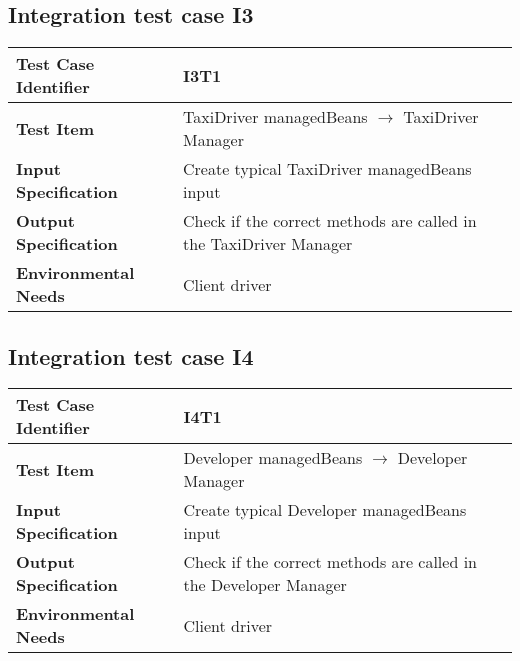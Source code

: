 \subsection{Integration test case I3}

\begin{table}[!htbp]
\begin{center}
\begin{tabular}[t]{p{}p{}}

\hline
\textbf{Test Case Identifier} & I3T1 \\
\hline
\textbf{Test Item} & TaxiDriver managedBeans $\rightarrow$ TaxiDriver Manager \\
\hline
\textbf{Input Specification} & Create typical TaxiDriver managedBeans input  \\
\hline
\textbf{Output Specification} & Check if the correct methods are called in the TaxiDriver Manager \\
\hline
\textbf{Environmental Needs} & Client driver \\
\hline

\end{tabular}
\end{center}
\end{table}

\subsection{Integration test case I4}

\begin{table}[!htbp]
\begin{center}
\begin{tabular}[t]{p{}p{}}

\hline
\textbf{Test Case Identifier} & I4T1 \\
\hline
\textbf{Test Item} & Developer managedBeans $\rightarrow$ Developer Manager \\
\hline
\textbf{Input Specification} & Create typical Developer managedBeans input  \\
\hline
\textbf{Output Specification} & Check if the correct methods are called in the Developer Manager \\
\hline
\textbf{Environmental Needs} & Client driver \\
\hline

\end{tabular}
\end{center}
\end{table}
\clearpage


